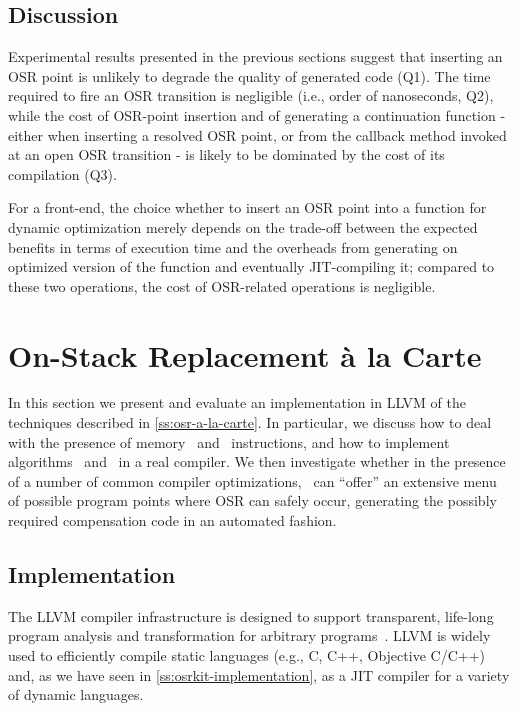 \subsection{Discussion}
Experimental results presented in the previous sections suggest that inserting an OSR point is unlikely to degrade the quality of generated code (Q1). The time required to fire an OSR transition is negligible (i.e., order of nanoseconds, Q2), while the cost of OSR-point insertion and of generating a continuation function - either when inserting a resolved OSR point, or from the callback method invoked at an open OSR transition - 
is likely to be dominated by the cost of its compilation (Q3).

For a front-end, the choice whether to insert an OSR point into a function for dynamic optimization merely depends on the trade-off between the expected benefits in terms of execution time and the overheads from generating on optimized version of the function and eventually JIT-compiling it; compared to these two operations, the cost of OSR-related operations is negligible. \missing


\section{On-Stack Replacement \`{a} la Carte}
\label{se:eval-OSR-alC}

In this section we present and evaluate an implementation in LLVM of the techniques described in \mysection\ref{ss:osr-a-la-carte}. In particular, we discuss how to deal with the presence of memory \load\ and \store\ instructions, and how to implement algorithms \apply\ and \buildcomp\ in a real compiler. We then investigate whether in the presence of a number of common compiler optimizations, \buildcomp\ can ``offer'' an extensive menu of possible program points where OSR can safely occur, generating the possibly required compensation code in an automated fashion.

\subsection{Implementation}
The LLVM compiler infrastructure is designed to support transparent, life-long program analysis and transformation for arbitrary programs~\cite{Lattner04}. LLVM is widely used to efficiently compile static languages (e.g., C, C++, Objective C/C++) and, as we have seen in \mysection\ref{ss:osrkit-implementation}, as a JIT compiler for a variety of dynamic languages.

